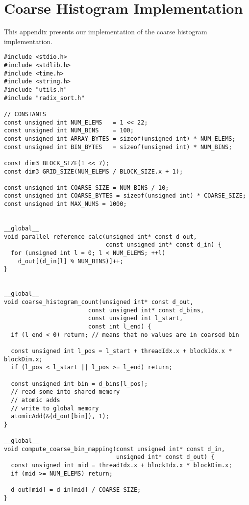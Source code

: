 \chapter{Coarse Histogram Implementation}
\label{ap:coarse histogram}

This appendix presents our implementation of the coarse histogram implementation.

\begin{lstlisting}[captionpos=t, xleftmargin=0.0pt, xrightmargin=0.0pt, caption={Coarse Histogram implementation}, label={lst:coarse histogram impl}]
#include <stdio.h>
#include <stdlib.h>
#include <time.h>
#include <string.h>
#include "utils.h"
#include "radix_sort.h"

// CONSTANTS
const unsigned int NUM_ELEMS   = 1 << 22;
const unsigned int NUM_BINS    = 100;
const unsigned int ARRAY_BYTES = sizeof(unsigned int) * NUM_ELEMS;
const unsigned int BIN_BYTES   = sizeof(unsigned int) * NUM_BINS;

const dim3 BLOCK_SIZE(1 << 7);
const dim3 GRID_SIZE(NUM_ELEMS / BLOCK_SIZE.x + 1);

const unsigned int COARSE_SIZE = NUM_BINS / 10;
const unsigned int COARSE_BYTES = sizeof(unsigned int) * COARSE_SIZE;
const unsigned int MAX_NUMS = 1000;


__global__
void parallel_reference_calc(unsigned int* const d_out,
                             const unsigned int* const d_in) {
  for (unsigned int l = 0; l < NUM_ELEMS; ++l)
    d_out[(d_in[l] % NUM_BINS)]++;
}


__global__
void coarse_histogram_count(unsigned int* const d_out,
                        const unsigned int* const d_bins,
                        const unsigned int l_start,
                        const int l_end) {
  if (l_end < 0) return; // means that no values are in coarsed bin

  const unsigned int l_pos = l_start + threadIdx.x + blockIdx.x * blockDim.x;
  if (l_pos < l_start || l_pos >= l_end) return;

  const unsigned int bin = d_bins[l_pos];
  // read some into shared memory
  // atomic adds
  // write to global memory
  atomicAdd(&(d_out[bin]), 1);
}

__global__
void compute_coarse_bin_mapping(const unsigned int* const d_in,
                                unsigned int* const d_out) {
  const unsigned int mid = threadIdx.x + blockIdx.x * blockDim.x;
  if (mid >= NUM_ELEMS) return;

  d_out[mid] = d_in[mid] / COARSE_SIZE;
}


\end{lstlisting}
